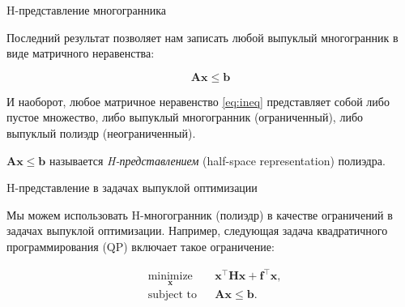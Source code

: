 \documentclass{beamer}
\begin{document}
\begin{frame}{H-представление многогранника}
	\begin{flushleft}
		
		Последний результат позволяет нам записать любой выпуклый многогранник в виде матричного неравенства:
		
		\begin{equation}
			\label{eq:ineq} 
			\mathbf{A} \mathbf{x} \leq  \mathbf{b} 
		\end{equation}
		
		И наоборот, любое матричное неравенство \eqref{eq:ineq} представляет собой либо пустое множество, либо выпуклый многогранник (ограниченный), либо выпуклый полиэдр (неограниченный).
		
		\bigskip
		
		\begin{definition}
			$\mathbf{A} \mathbf{x} \leq  \mathbf{b}$ называется \emph{H-представлением} (half-space representation) полиэдра.
		\end{definition}
		
	\end{flushleft}
\end{frame}



\begin{frame}{H-представление в задачах выпуклой оптимизации}
	\begin{flushleft}
		
		Мы можем использовать H-многогранник (полиэдр) в качестве ограничений в задачах выпуклой оптимизации. Например, следующая задача квадратичного программирования (QP) включает такое ограничение:
		
		\begin{equation}
			\begin{aligned}
				& \underset{\mathbf{x}}{\text{minimize}}
				& & \mathbf{x}^\top \mathbf{H} \mathbf{x} + \mathbf{f}^\top\mathbf{x}, \\
				& \text{subject to}
				& & \mathbf{A}\mathbf{x} \leq \mathbf{b}.
			\end{aligned}
		\end{equation}
		
	\end{flushleft}
\end{frame}
\end{document}
